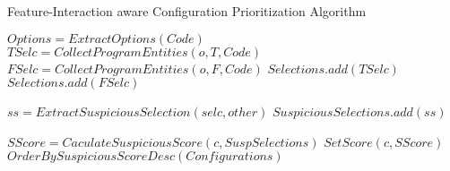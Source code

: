 \begin{algorithm}
\caption{Feature-Interaction aware Configuration Prioritization Algorithm}	
 \label{agl1}
\begin{algorithmic}[1]
\State $Options = ExtractOptions(Code)$
\State $TSelc = CollectProgramEntities(o, T, Code)$
\State $FSelc = CollectProgramEntities(o, F, Code)$
\State $Selections.add(TSelc)$
\State $Selections.add(FSelc)$
\EndFor

					\State $ss=ExtractSuspiciousSelection(selc, other)$
					\State $SuspiciousSelections.add(ss)$
				\EndIf
			\EndIf
	\EndFor
\EndFor
\EndProcedure
\Statex

	\State $SScore = CaculateSuspiciousScore(c, SuspSelections)$
	\State $SetScore(c, SScore)$
\EndFor
\State $OrderBySuspiciousScoreDesc(Configurations)$
\EndProcedure
\end{algorithmic}
\end{algorithm}
